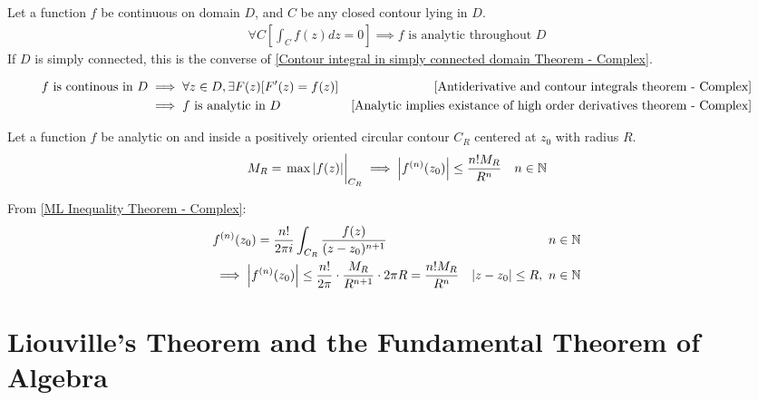 \documentclass[12pt, english]{book}
\makeatletter
\renewenvironment{proof}[1][\proofname]{\par
	\pushQED{\qed}%
	\normalfont \topsep6\p@\@plus6\p@\relax
	\list{}{%
		\settowidth{\leftmargin}{\itshape\proofname:\hskip\labelsep}%
		\setlength{\labelwidth}{0pt}%
		\setlength{\itemindent}{-\leftmargin}%
		}%
	\item[\hskip\labelsep\itshape#1\@addpunct{:}]\ignorespaces
	}{\popQED\endlist\@endpefalse}
\makeatother
\begin{document}
	\begin{theorem}
		\label{Continuity on closed contour implies and zero contour integral implies analycity Theorem - Complex}
		Let a function \(f\) be continuous on domain \(D\), and \(C\) be any closed contour lying in \(D\).
		\begin{align*}
			\forall C \left[\int_{C} f(z) dz = 0 \right]
			\implies f \text{ is analytic throughout } D
		\end{align*}
		If \(D\) is simply connected, this is the converse of \cref{Contour integral in simply connected domain Theorem - Complex}.
	\end{theorem}
	\begin{proof}
		\begin{align*}
			f \text{ is continous in } D
			&\implies \forall z \in D, \exists F(z) [F'(z) = f(z)] 
				& \Cref{Antiderivative and contour integrals theorem - Complex}\\
			&\implies f \text{ is analytic in }  D
				& \Cref{Analytic implies existance of high order derivatives theorem - Complex}
		\end{align*}
	\end{proof}

	\begin{theorem}
		\label{Cauchy's Inequality Theorem - Complex}
		Let a function \(f\) be analytic on and inside a positively oriented circular contour \(C_R\) centered at \(z_0\) with radius \(R\). 
		\begin{align*}
			M_R = \eval{\max\abs{f(z)}}_{C_R} &\implies \abs{f^{(n)}(z_0)} \leq \frac{n! M_R}{R^n}
				& n \in \mathbb{N}
		\end{align*}
	\end{theorem}
	\begin{proof}
		From \cref{ML Inequality Theorem - Complex}:
		\begin{align*}
			&f^{(n)}(z_0) = \frac{n!}{2\pi i} \int_{C_R} \frac{f(z)}{(z-z_0)^{n+1}} & n \in \mathbb{N}\\
			&\implies \abs{f^{(n)}(z_0)} \leq \frac{n!}{2\pi} \cdot \frac{M_R}{R^{n+1}} \cdot 2 \pi R = \frac{n! M_R}{R^n} & \abs{z-z_0}\leq R, \  n \in \mathbb{N}
		\end{align*}
	\end{proof}
	
	\section{Liouville's Theorem and the Fundamental Theorem of Algebra} \label{Liouville's Theorem and the Fundamental Theorem of Algebra Section - Complex}
	
\end{document}
